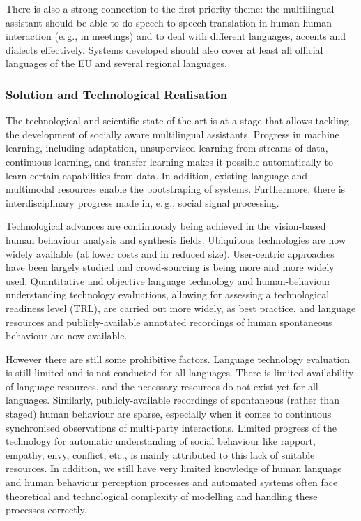 \documentclass[10pt, plain]{../../metanetpaper}
\begin{document}
\begin{multicols}{2}
There is also a strong connection to the first priority theme: the multilingual assistant should be able to do speech-to-speech translation in human-human-interaction (e.\,g., in meetings) and to deal with different languages, accents and dialects effectively. Systems developed should also cover at least all official languages of the EU and several regional languages.

\subsubsection{Solution and Technological Realisation}
\label{sec:solut-techn-real-pt3}

The technological and scientific state-of-the-art is at a stage that allows tackling the development of socially aware multilingual assistants. Progress in machine learning, including adaptation, unsupervised learning from streams of data, continuous learning, and transfer learning makes it possible automatically to learn certain capabilities from data. In addition, existing language and multimodal resources enable the bootstraping of systems. Furthermore, there is interdisciplinary progress made in, e.\,g., social signal processing.
 
Technological advances are continuously being achieved in the vision-based human behaviour analysis and synthesis fields. Ubiquitous technologies are now widely available (at lower costs and in reduced size). User-centric approaches have been largely studied and crowd-sourcing is being more and more widely used. Quantitative and objective language technology and human-behaviour understanding technology evaluations, allowing for assessing a technological readiness level (TRL), are carried out more widely, as best practice, and language resources and publicly-available annotated recordings of human spontaneous behaviour are now available.
 
However there are still some prohibitive factors. Language technology evaluation is still limited and is not conducted for all languages. There is limited availability of language resources, and the necessary resources do not exist yet for all languages. Similarly, publicly-available recordings of spontaneous (rather than staged) human behaviour are sparse, especially when it comes to continuous synchronised observations of multi-party interactions. Limited progress of the technology for automatic understanding of social behaviour like rapport, empathy, envy, conflict, etc., is mainly attributed to this lack of suitable resources. In addition, we still have very limited knowledge of human language and human behaviour perception processes and automated systems often face theoretical and technological complexity of modelling and handling these processes correctly.


\end{multicols}
\end{document}
